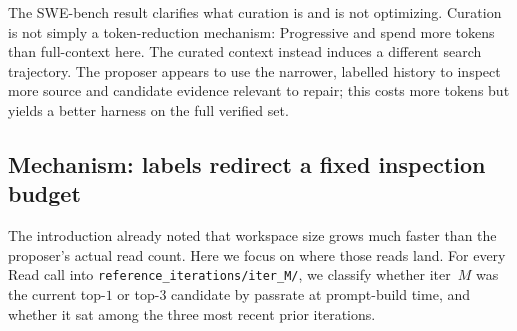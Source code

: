 \begin{table}[t]
\centering
\small
\caption{SWE-bench Verified with the Mini-SWE inner solver. This is a single
20-iteration claudekimi run; verified passrate is measured on the full
500-issue set. Cost is millions of tokens per propose.}
\label{tab:swe}
\end{table}

The SWE-bench result clarifies what curation is and is not optimizing.
Curation is not simply a token-reduction mechanism: Progressive and \name
spend more tokens than full-context here. The curated context instead
induces a different search trajectory. The proposer appears to use the
narrower, labelled history to inspect more source and candidate evidence
relevant to repair; this costs more tokens but yields a better harness on
the full verified set.

\subsection{Mechanism: labels redirect a fixed inspection budget}
\label{sec:mechanism}

The introduction already noted that workspace size grows much faster than
the proposer's actual read count. Here we focus on where those reads land.
For every Read call into \texttt{reference\_iterations/iter\_M/}, we
classify whether iter~$M$ was the current top-$1$ or top-$3$ candidate by
passrate at prompt-build time, and whether it sat among the three most
recent prior iterations.

